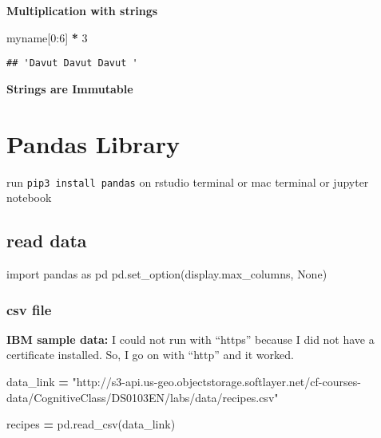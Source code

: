 \documentclass[
]{book}
\newenvironment{Shaded}{\begin{snugshade}}{\end{snugshade}}
\newcommand{\DecValTok}[1]{\textcolor[rgb]{0.00,0.00,0.81}{#1}}
\newcommand{\ImportTok}[1]{#1}
\newcommand{\NormalTok}[1]{#1}
\newcommand{\OperatorTok}[1]{\textcolor[rgb]{0.81,0.36,0.00}{\textbf{#1}}}
\newcommand{\StringTok}[1]{\textcolor[rgb]{0.31,0.60,0.02}{#1}}
\newcommand{\VariableTok}[1]{\textcolor[rgb]{0.00,0.00,0.00}{#1}}
\begin{document}
\textbf{Multiplication with strings}

\begin{Shaded}
\begin{Highlighting}[]
\NormalTok{myname[}\DecValTok{0}\NormalTok{:}\DecValTok{6}\NormalTok{] }\OperatorTok{*} \DecValTok{3}
\end{Highlighting}
\end{Shaded}

\begin{verbatim}
## 'Davut Davut Davut '
\end{verbatim}

\textbf{Strings are Immutable}

\hypertarget{pandas-library}{%
\chapter{Pandas Library}\label{pandas-library}}

run \texttt{pip3\ install\ pandas}
on rstudio terminal or mac terminal or jupyter notebook

\hypertarget{read-data}{%
\section{read data}\label{read-data}}

\begin{Shaded}
\begin{Highlighting}[]
\ImportTok{import}\NormalTok{ pandas }\ImportTok{as}\NormalTok{ pd }
\NormalTok{pd.set\_option(}\StringTok{\textquotesingle{}display.max\_columns\textquotesingle{}}\NormalTok{, }\VariableTok{None}\NormalTok{)}
\end{Highlighting}
\end{Shaded}

\hypertarget{csv-file}{%
\subsection{csv file}\label{csv-file}}

\textbf{IBM sample data:} I could not run with ``https'' because I did not have a certificate installed. So, I go on with ``http'' and it worked.

\begin{Shaded}
\begin{Highlighting}[]
\NormalTok{data\_link }\OperatorTok{=} \StringTok{"http://s3{-}api.us{-}geo.objectstorage.softlayer.net/cf{-}courses{-}data/CognitiveClass/DS0103EN/labs/data/recipes.csv"}

\NormalTok{recipes }\OperatorTok{=}\NormalTok{ pd.read\_csv(data\_link)}
\end{Highlighting}
\end{Shaded}
\end{document}
